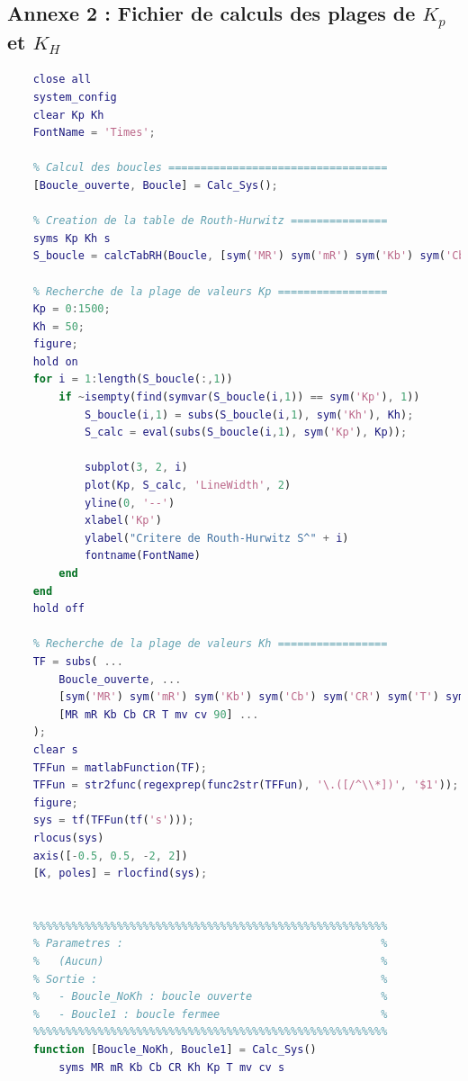 \documentclass[a4paper,12pt]{article}
\begin{document}
    \subsection{Annexe 2 : Fichier de calculs des plages de $K_p$ et $K_H$} \label{Annexe:calcRHFile}
    \begin{lstlisting}[caption={Fonction simulink de calcul du compensateur}, language=Matlab]
    % Initialisation ======================================
    close all
    system_config
    clear Kp Kh
    FontName = 'Times';

    % Calcul des boucles ==================================
    [Boucle_ouverte, Boucle] = Calc_Sys();

    % Creation de la table de Routh-Hurwitz ===============
    syms Kp Kh s
    S_boucle = calcTabRH(Boucle, [sym('MR') sym('mR') sym('Kb') sym('Cb') sym('CR') sym('T') sym('mv') sym('cv')], [MR mR Kb Cb CR T mv cv], s);

    % Recherche de la plage de valeurs Kp =================
    Kp = 0:1500;
    Kh = 50;
    figure;
    hold on
    for i = 1:length(S_boucle(:,1))
        if ~isempty(find(symvar(S_boucle(i,1)) == sym('Kp'), 1))
            S_boucle(i,1) = subs(S_boucle(i,1), sym('Kh'), Kh);
            S_calc = eval(subs(S_boucle(i,1), sym('Kp'), Kp));
    
            subplot(3, 2, i)
            plot(Kp, S_calc, 'LineWidth', 2)
            yline(0, '--')
            xlabel('Kp')
            ylabel("Critere de Routh-Hurwitz S^" + i)
            fontname(FontName)
        end
    end
    hold off
    
    % Recherche de la plage de valeurs Kh =================
    TF = subs( ...
        Boucle_ouverte, ...
        [sym('MR') sym('mR') sym('Kb') sym('Cb') sym('CR') sym('T') sym('mv') sym('cv') sym('Kp')], ...
        [MR mR Kb Cb CR T mv cv 90] ...
    );
    clear s
    TFFun = matlabFunction(TF);
    TFFun = str2func(regexprep(func2str(TFFun), '\.([/^\\*])', '$1'));
    figure;
    sys = tf(TFFun(tf('s')));
    rlocus(sys)
    axis([-0.5, 0.5, -2, 2])
    [K, poles] = rlocfind(sys);
    

    %%%%%%%%%%%%%%%%%%%%%%%%%%%%%%%%%%%%%%%%%%%%%%%%%%%%%%%
    % Parametres :                                        %
    %   (Aucun)                                           %
    % Sortie :                                            %
    %   - Boucle_NoKh : boucle ouverte                    %
    %   - Boucle1 : boucle fermee                         %
    %%%%%%%%%%%%%%%%%%%%%%%%%%%%%%%%%%%%%%%%%%%%%%%%%%%%%%%
    function [Boucle_NoKh, Boucle1] = Calc_Sys()
        syms MR mR Kb Cb CR Kh Kp T mv cv s


\end{lstlisting}
\end{document}
